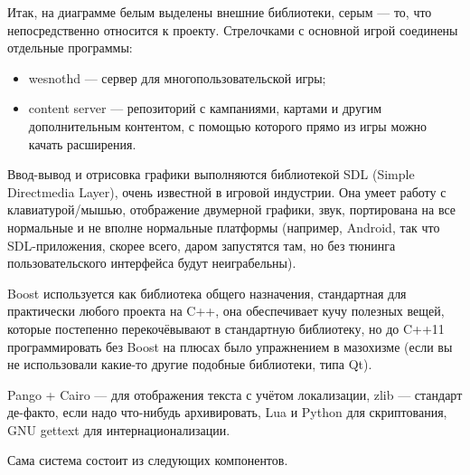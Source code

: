 \documentclass[a5paper]{article}
\begin{document}
Итак, на диаграмме белым выделены внешние библиотеки, серым --- то, что непосредственно относится к проекту. Стрелочками с основной игрой соединены отдельные программы:

\begin{itemize}
    \item wesnothd --- сервер для многопользовательской игры;
    \item content server --- репозиторий с кампаниями, картами и другим дополнительным контентом, с помощью которого прямо из игры можно качать расширения.
\end{itemize}

Ввод-вывод и отрисовка графики выполняются библиотекой SDL (Simple Directmedia Layer), очень известной в игровой индустрии. Она умеет работу с клавиатурой/мышью, отображение двумерной графики, звук, портирована на все нормальные и не вполне нормальные платформы (например, Android, так что SDL-приложения, скорее всего, даром запустятся там, но без тюнинга пользовательского интерфейса будут неиграбельны).

Boost используется как библиотека общего назначения, стандартная для практически любого проекта на C++, она обеспечивает кучу полезных вещей, которые постепенно перекочёвывают в стандартную библиотеку, но до C++11 программировать без Boost на плюсах было упражнением в мазохизме (если вы не использовали какие-то другие подобные библиотеки, типа Qt).

Pango + Cairo --- для отображения текста с учётом локализации, zlib --- стандарт де-факто, если надо что-нибудь архивировать, Lua и Python для скриптования, GNU gettext для интернационализации.

Сама система состоит из следующих компонентов.
\end{document}
